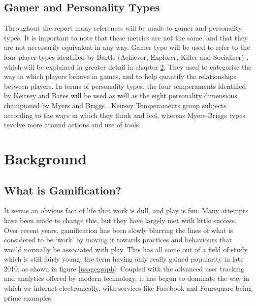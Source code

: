 \documentclass[12pt,a4paper,twoside]{report}
\begin{document}
\section{Gamer and Personality Types}
Throughout the report many references will be made to gamer and personality types. It is important to note that these metrics are not the same, and that they are not necessarily equivalent in any way. Gamer type will be used to refer to the four player types identified by Bartle (Achiever, Explorer, Killer and Socialiser) \cite{bartle1996hearts}, which will be explained in greater detail in chapter \ref{sec:background}. They used to categorise the way in which players behave in games, and to help quantify the relationships between players. In terms of personality types, the four temperaments identified by Keirsey and Bates \cite{keirsey1998please} \cite{keirsey1984} will be used as well as the eight personality dimensions championed by Myers and Briggs \cite{myers1995gifts}. Keirsey Temperaments group subjects according to the ways in which they think and feel, whereas Myers-Briggs types revolve more around actions and use of tools.

\chapter{Background}
\label{sec:background}
\section{What is Gamification?}
It seems an obvious fact of life that work is dull, and play is fun. Many attempts have been made to change this, but they have largely met with little success. Over recent years, gamification has been slowly blurring the lines of what is considered to be `work' by moving it towards practices and behaviours that would normally be associated with play. This has all come out of a field of study which is still fairly young, the term having only really gained popularity in late 2010, as shown in figure \ref{usagegraph}. Coupled with the advanced user tracking and analytics offered by modern technology, it has begun to dominate the way in which we interact electronically, with services like Facebook and Foursquare being prime examples.
\end{document}
